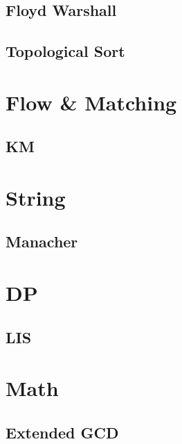     \subsection{Floyd Warshall}
        
    \subsection{Topological Sort}
        

\section{Flow \& Matching}
    \subsection{KM}
        

\section{String}
    \subsection{Manacher}
        

\section{DP}
    \subsection{LIS}
        

\section{Math}
    \subsection{Extended GCD}
        
